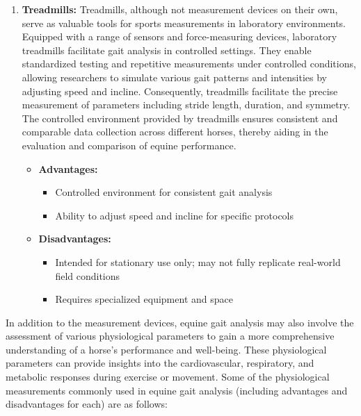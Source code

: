 \begin{enumerate}
\item \textbf{Treadmills:} Treadmills, although not measurement devices on their own, serve as valuable tools for sports measurements in laboratory environments. Equipped with a range of sensors and force-measuring devices, laboratory treadmills facilitate gait analysis in controlled settings. They enable standardized testing and repetitive measurements under controlled conditions, allowing researchers to simulate various gait patterns and intensities by adjusting speed and incline. Consequently, treadmills facilitate the precise measurement of parameters including stride length, duration, and symmetry. The controlled environment provided by treadmills ensures consistent and comparable data collection across different horses, thereby aiding in the evaluation and comparison of equine performance.
\begin{itemize}
\item[] \textbf{\small Advantages:}
\begin{itemize}
\item Controlled environment for consistent gait analysis
\item Ability to adjust speed and incline for specific protocols
\end{itemize}
\item[] \textbf{\small Disadvantages:}
\begin{itemize}
\item Intended for stationary use only; may not fully replicate real-world field conditions
\item Requires specialized equipment and space
\end{itemize}
\end{itemize}
\end{enumerate}

In addition to the measurement devices, equine gait analysis may also involve the assessment of various physiological parameters to gain a more comprehensive understanding of a horse's performance and well-being. These physiological parameters can provide insights into the cardiovascular, respiratory, and metabolic responses during exercise or movement. Some of the physiological measurements commonly used in equine gait analysis (including advantages and disadvantages for each) are as follows:

